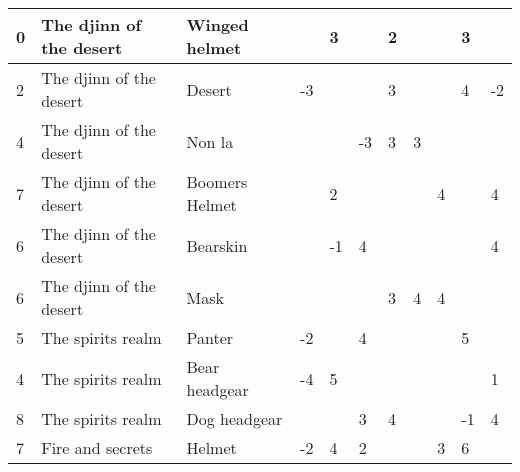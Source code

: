 \begin{table}[H]
{\begin{tabular}{|l|l|l|l|l|l|l|l|l|l|l|}
0 & The djinn of the desert & Winged helmet &  & 3 &  & 2 &  &  & 3 &  \\ \hline
2 & The djinn of the desert & Desert & -3 &  &  & 3 &  &  & 4 & -2 \\ \hline
4 & The djinn of the desert & Non la &  &  & -3 & 3 & 3 &  &  &  \\ \hline
7 & The djinn of the desert & Boomers Helmet &  & 2 &  &  &  & 4 &  & 4 \\ \hline
6 & The djinn of the desert & Bearskin &  & -1 & 4 &  &  &  &  & 4 \\ \hline
6 & The djinn of the desert & Mask &  &  &  & 3 & 4 & 4 &  &  \\ \hline
5 & The spirits realm& Panter & -2 &  & 4 &  &  &  & 5 &  \\ \hline
4 & The spirits realm & Bear headgear & -4 & 5 &  &  &  &  &  & 1 \\ \hline
8 & The spirits realm & Dog headgear &  &  & 3 & 4 &  &  & -1 & 4 \\ \hline
7 & Fire and secrets & Helmet & -2 & 4 & 2 &  &  & 3 & 6 &  \\ \hline
\end{tabular}}
\end{table}

